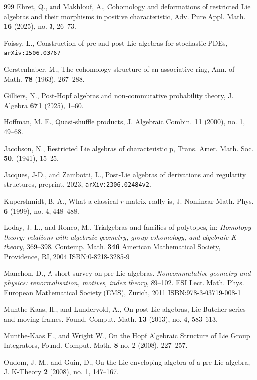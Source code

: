\documentclass[12pt]{article}
\begin{document}
\begin{thebibliography}{999}
	Ehret, Q., and Makhlouf, A.,
	Cohomology and deformations of restricted Lie algebras and their morphisms in  positive characteristic, Adv. Pure Appl. Math. \textbf{16} (2025), no. 3, 26–73.

	Foissy, L.,
	Construction of pre-and post-Lie algebras for stochastic PDEs, \texttt{arXiv:2506.03767}


 Gerstenhaber, M., The cohomology structure of an associative ring, Ann. of Math. \textbf{78} (1963),
267--288.

Gilliers, N.,
Post-Hopf algebras and non-commutative probability theory, J. Algebra \textbf{671} (2025), 1--60.

 Hoffman, M. E.,
Quasi-shuffle products,
J. Algebraic Combin. \textbf{11} (2000), no. 1, 49–68.

Jacobson, N.,
Restricted Lie algebras of characteristic p, Trans. Amer. Math. Soc. \textbf{50}, (1941), 15--25.



Jacques, J-D., and Zambotti, L.,
Post-Lie algebras of derivations and regularity structures, preprint, 2023, \texttt{arXiv:2306.02484v2}. 



Kupershmidt, B. A.,
What a classical $r$-matrix really is,
J. Nonlinear Math. Phys. \textbf{6} (1999), no. 4, 448–488.

 Loday, J.-L., and Ronco, M.,
Trialgebras and families of polytopes, in: \textit{Homotopy theory: relations with algebraic geometry, group cohomology, and algebraic K-theory}, 369–398.
Contemp. Math. \textbf{346}
American Mathematical Society, Providence, RI, 2004
ISBN:0-8218-3285-9

Manchon, D.,
A short survey on pre-Lie algebras. \textit{Noncommutative geometry and physics: renormalisation, motives, index theory}, 89–102.
ESI Lect. Math. Phys.
European Mathematical Society (EMS), Zürich, 2011
ISBN:978-3-03719-008-1

 Munthe-Kaas, H., and Lundervold, A.,
On post-Lie algebras, Lie-Butcher series and moving frames.
Found. Comput. Math. \textbf{13} (2013), no. 4, 583--613.

 Munthe-Kaas H., and Wright W., On the Hopf Algebraic Structure of Lie
Group Integrators, Found. Comput. Math. \textbf{8} no. 2 (2008), 227--257.

Oudom, J.-M., and Guin, D.,
On the Lie enveloping algebra of a pre-Lie algebra,
J. K-Theory \textbf{2} (2008), no. 1, 147--167.



\end{thebibliography}
\end{document}
